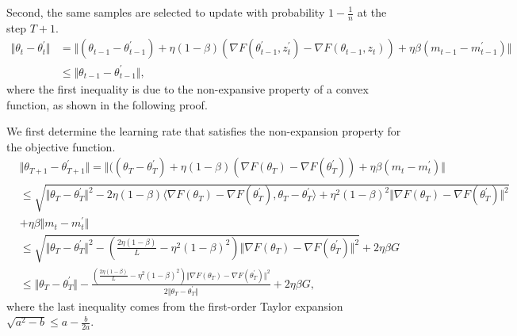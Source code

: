 Second, the same samples are selected to update with probability $1-\frac{1}{n}$ at the step $T+1$. 
 \begin{equation}
  \begin{aligned}
   \Vert \theta_t -\theta_t^{\prime} \Vert &= \Vert (\theta_{t-1} - \theta_{t-1}^{\prime}) + \eta (1-\beta)(\nabla F(\theta_{t-1}^{\prime},z_{t}^{\prime}) - \nabla F(\theta_{t-1},z_{t})) + \eta \beta(m_{t-1} - m_{t-1}^{\prime})\Vert\\
    &\leq \Vert\theta_{t-1} - \theta_{t-1}^{\prime}\Vert,
  \end{aligned}
 \end{equation}
where the first inequality is due to the non-expansive property of a convex function, as shown in the following proof.

We first determine the learning rate that satisfies the non-expansion property for the objective function.
\begin{equation}\label{eq:app2.3}
     \begin{aligned}
      &\Vert \theta_{T+1} - \theta_{T+1}^{\prime}\Vert = \Vert ((\theta_{T}-\theta_{T}^{\prime}) + \eta(1-\beta) (\nabla F(\theta_{T})-\nabla F(\theta_{T}^{\prime}))
      +\eta\beta(m_t-m_t^{\prime})\Vert  \\
      &\leq \sqrt{\Vert \theta_{T} \!-\! \theta_{T}^{\prime} \Vert^2 \!-\! 2\eta (1\!-\!\beta)\langle \nabla F(\theta_{T})\! -\!\nabla F(\theta_{T}^{\prime}), \theta_T \!-\! \theta_T^{\prime} \rangle \!+\!\eta^2(1 \!-\!\beta)^2 \Vert \nabla F(\theta_{T}) \!-\! \nabla F(\theta_{T}^{\prime})\Vert^2}\\& + \eta\beta\Vert m_t-m_t^{\prime}\Vert\\
      &\leq \sqrt{\Vert \theta_T- \theta_T^{\prime}\Vert^2 - \left(\frac{2\eta (1-\beta)}{L} -\eta^2(1-\beta)^2 \right) \Vert \nabla F(\theta_{T}) -\nabla F(\theta_{T}^{\prime})\Vert^2} + 2\eta\beta G \\
      &\leq \Vert \theta_T- \theta_T^{\prime}\Vert - \frac{\left(\frac{2\eta (1-\beta)}{L} -\eta^2(1-\beta)^2 \right) \Vert \nabla F(\theta_{T}) -\nabla F(\theta_{T}^{\prime})\Vert^2}{2\Vert \theta_T- \theta_T^{\prime}\Vert} + 2\eta\beta G,
     \end{aligned}
\end{equation}
where the last inequality comes from the first-order Taylor expansion $\sqrt{a^2-b}\leq a-\frac{b}{2a}$. 


